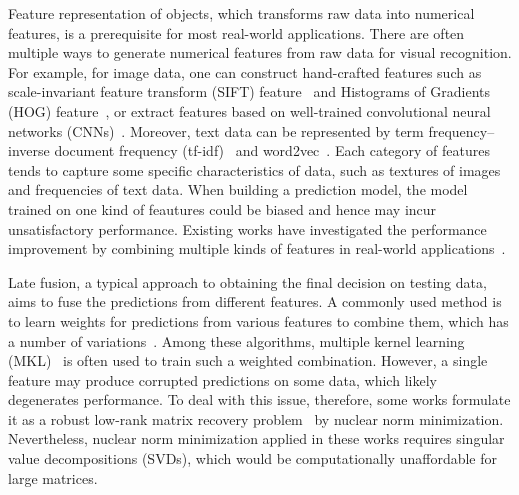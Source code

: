 \documentclass[10pt,twocolumn,letterpaper]{article}
\begin{document}
Feature representation of objects, which transforms raw data into numerical features, is a prerequisite for most real-world applications.
There are often multiple ways to generate numerical features from raw data for visual recognition.
For example, for image data, one can construct hand-crafted features such as scale-invariant feature transform
(SIFT) feature~\cite{loweijcv2004distinctive} and Histograms of Gradients (HOG) feature~\cite{dalalcvpr2005histograms},
or extract features based on well-trained convolutional neural networks (CNNs)~\cite{krizhevsky2012imagenet}.
Moreover, text data can be represented by term frequency–inverse document frequency (tf-idf)~\cite{manning2008introduction} and word2vec~\cite{mikoloviclr2013efficient}.
Each category of features tends to capture some specific characteristics of data,
such as textures of images and frequencies of text data.
When building a prediction model, the model trained on one kind of feautures could be biased and hence may incur unsatisfactory performance.
Existing works have investigated the performance improvement by combining multiple kinds of features in real-world applications~\cite{gehler2009feature,ye2012robust,xuiccv2013feature,lai2015learning}.


Late fusion, a typical approach to obtaining the final decision on testing data, aims to fuse the predictions from different features.
A commonly used method is to learn weights for predictions from various features to combine them, which has a number of variations~\cite{gehler2009feature,xuiccv2013feature,lai2015learning}.
Among these algorithms, multiple kernel learning (MKL)~\cite{lanckriet2004learning,Rakotomamonjy2008Simplemkl} is often used to train such a weighted combination.
However, a single feature may produce corrupted predictions on some data, which likely degenerates performance.
To deal with this issue, therefore, some works formulate it as a robust low-rank matrix recovery problem~\cite{gaoijcai2016robust,ye2012robust} by nuclear norm minimization.
Nevertheless, nuclear norm minimization applied in these works requires singular value decompositions (SVDs), which would be computationally unaffordable for large matrices.
\end{document}
